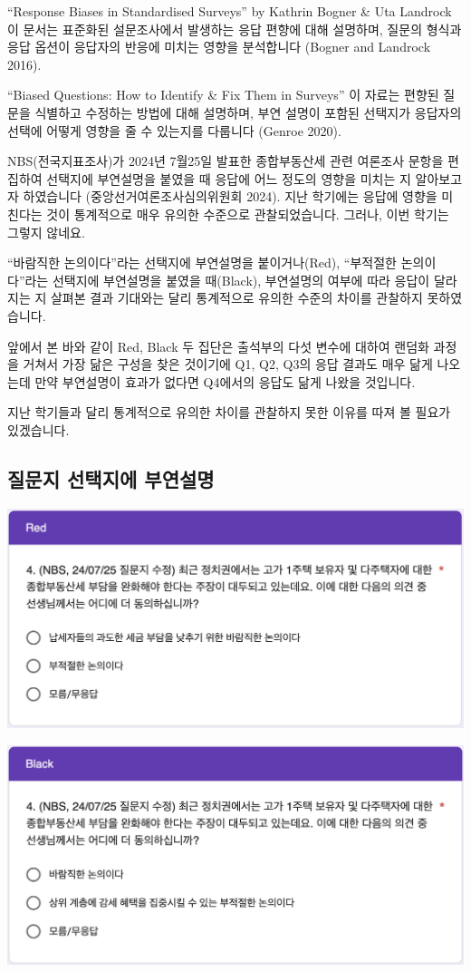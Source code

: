 \documentclass[
]{book}
\begin{document}
``Response Biases in Standardised Surveys'' by Kathrin Bogner \& Uta Landrock
이 문서는 표준화된 설문조사에서 발생하는 응답 편향에 대해 설명하며, 질문의 형식과 응답 옵션이 응답자의 반응에 미치는 영향을 분석합니다 (Bogner and Landrock 2016).

``Biased Questions: How to Identify \& Fix Them in Surveys''
이 자료는 편향된 질문을 식별하고 수정하는 방법에 대해 설명하며, 부연 설명이 포함된 선택지가 응답자의 선택에 어떻게 영향을 줄 수 있는지를 다룹니다 (Genroe 2020).

NBS(전국지표조사)가 2024년 7월25일 발표한 종합부동산세 관련 여론조사 문항을 편집하여 선택지에 부연설명을 붙였을 때 응답에 어느 정도의 영향을 미치는 지 알아보고자 하였습니다 (중앙선거여론조사심의위원회 2024). 지난 학기에는 응답에 영향을 미친다는 것이 통계적으로 매우 유의한 수준으로 관찰되었습니다. 그러나, 이번 학기는 그렇지 않네요.

``바람직한 논의이다''라는 선택지에 부연설명을 붙이거나(Red), ``부적절한 논의이다''라는 선택지에 부연설명을 붙였을 때(Black), 부연설명의 여부에 따라 응답이 달라지는 지 살펴본 결과 기대와는 달리 통계적으로 유의한 수준의 차이를 관찰하지 못하였습니다.

앞에서 본 바와 같이 Red, Black 두 집단은 출석부의 다섯 변수에 대하여 랜덤화 과정을 거쳐서 가장 닮은 구성을 찾은 것이기에 Q1, Q2, Q3의 응답 결과도 매우 닮게 나오는데 만약 부연설명이 효과가 없다면 Q4에서의 응답도 닮게 나왔을 것입니다.

지난 학기들과 달리 통계적으로 유의한 차이를 관찰하지 못한 이유를 따져 볼 필요가 있겠습니다.

\subsection{질문지 선택지에 부연설명}\label{uxc9c8uxbb38uxc9c0-uxc120uxd0dduxc9c0uxc5d0-uxbd80uxc5f0uxc124uxba85}

\begin{flushleft}\includegraphics[width=0.67\linewidth]{./pics/Quiz240902_Q4_Red} \end{flushleft}

\begin{flushleft}\includegraphics[width=0.67\linewidth]{./pics/Quiz240902_Q4_Black} \end{flushleft}
\end{document}
